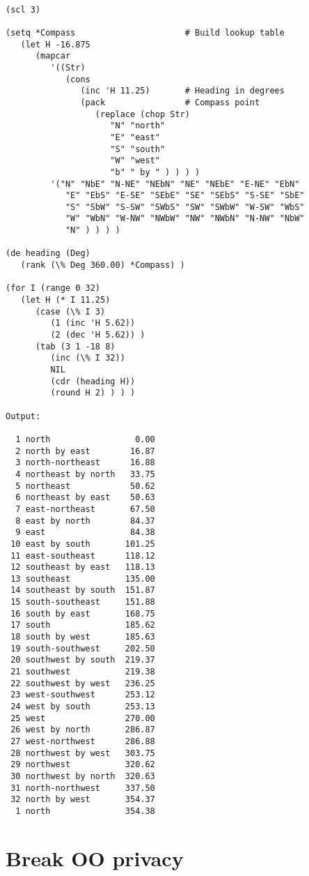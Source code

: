 \begin{verbatim}

(scl 3)

(setq *Compass                      # Build lookup table
   (let H -16.875
      (mapcar
         '((Str)
            (cons
               (inc 'H 11.25)       # Heading in degrees
               (pack                # Compass point
                  (replace (chop Str)
                     "N" "north"
                     "E" "east"
                     "S" "south"
                     "W" "west"
                     "b" " by " ) ) ) )
         '("N" "NbE" "N-NE" "NEbN" "NE" "NEbE" "E-NE" "EbN"
            "E" "EbS" "E-SE" "SEbE" "SE" "SEbS" "S-SE" "SbE"
            "S" "SbW" "S-SW" "SWbS" "SW" "SWbW" "W-SW" "WbS"
            "W" "WbN" "W-NW" "NWbW" "NW" "NWbN" "N-NW" "NbW"
            "N" ) ) ) )

(de heading (Deg)
   (rank (\% Deg 360.00) *Compass) )

(for I (range 0 32)
   (let H (* I 11.25)
      (case (\% I 3)
         (1 (inc 'H 5.62))
         (2 (dec 'H 5.62)) )
      (tab (3 1 -18 8)
         (inc (\% I 32))
         NIL
         (cdr (heading H))
         (round H 2) ) ) )

Output:

  1 north                 0.00
  2 north by east        16.87
  3 north-northeast      16.88
  4 northeast by north   33.75
  5 northeast            50.62
  6 northeast by east    50.63
  7 east-northeast       67.50
  8 east by north        84.37
  9 east                 84.38
 10 east by south       101.25
 11 east-southeast      118.12
 12 southeast by east   118.13
 13 southeast           135.00
 14 southeast by south  151.87
 15 south-southeast     151.88
 16 south by east       168.75
 17 south               185.62
 18 south by west       185.63
 19 south-southwest     202.50
 20 southwest by south  219.37
 21 southwest           219.38
 22 southwest by west   236.25
 23 west-southwest      253.12
 24 west by south       253.13
 25 west                270.00
 26 west by north       286.87
 27 west-northwest      286.88
 28 northwest by west   303.75
 29 northwest           320.62
 30 northwest by north  320.63
 31 north-northwest     337.50
 32 north by west       354.37
  1 north               354.38

\end{verbatim}

\section*{Break OO privacy}

